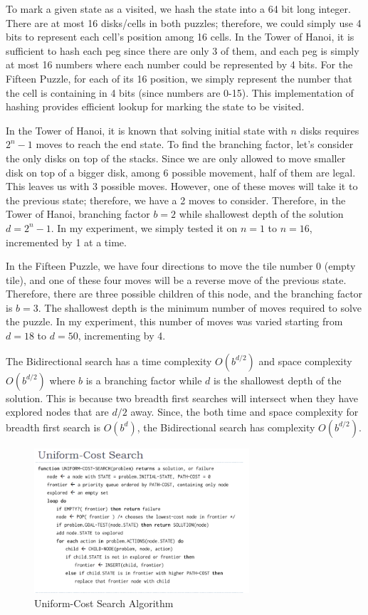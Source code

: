 \documentclass[conference]{IEEEtran}
\begin{document}
To mark a given state as a visited, we hash the state into a 64 bit long integer. There are at most 16 disks/cells in both puzzles; therefore, we could simply use 4 bits to represent each cell's position among 16 cells. In the Tower of Hanoi, it is sufficient to hash each peg since there are only 3 of them, and each peg is simply at most 16 numbers where each number could be represented by 4 bits. For the Fifteen Puzzle, for each of its 16 position, we simply represent the number that the cell is containing in 4 bits (since numbers are 0-15). This implementation of hashing provides efficient lookup for marking the state to be visited.

In the Tower of Hanoi, it is known that solving initial state with $n$ disks requires $2^n - 1$ moves to reach the end state. To find the branching factor, let's consider the only disks on top of the stacks. Since we are only allowed to move smaller disk on top of a bigger disk, among 6 possible movement, half of them are legal. This leaves us with 3 possible moves. However, one of these moves will take it to the previous state; therefore, we have a 2 moves to consider. Therefore, in the Tower of Hanoi, branching factor $b = 2$ while shallowest depth of the solution $d = 2^n - 1$. In my experiment, we simply tested it on $n = 1$ to $n = 16$, incremented by 1 at a time.

In the Fifteen Puzzle, we have four directions to move the tile number 0 (empty tile), and one of these four moves will be a reverse move of the previous state. Therefore, there are three possible children of this node, and the branching factor is $b = 3$. The shallowest depth is the minimum number of moves required to solve the puzzle. In my experiment, this number of moves was varied starting from $d = 18$ to $d = 50$, incrementing by 4.

The Bidirectional search has a time complexity $O(b^{d/2})$ and space complexity $O(b^{d/2})$ where $b$ is a branching factor while $d$ is the shallowest depth of the solution. This is because two breadth first searches will intersect when they have explored nodes that are $d/2$ away. Since, the both time and space complexity for breadth first search is $O(b^d)$, the Bidirectional search has complexity $O(b^{d/2})$. 


\begin{figure}[!t]
\includegraphics[width=8cm]{uniform_cost}
\centering
\caption{Uniform-Cost Search Algorithm}
\end{figure}
\end{document}
